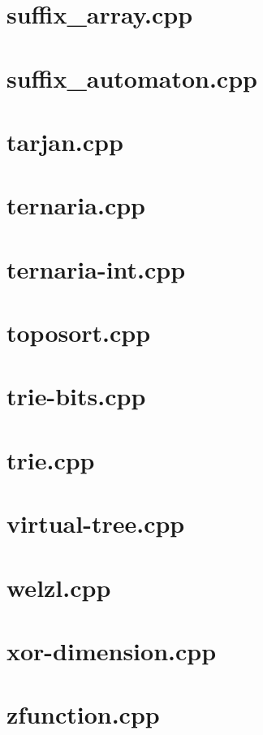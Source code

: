 \documentclass[a4paper,12pt]{article}
\begin{document}
\section{suffix_array.cpp}


\section{suffix_automaton.cpp}


\section{tarjan.cpp}


\section{ternaria.cpp}


\section{ternaria-int.cpp}


\section{toposort.cpp}


\section{trie-bits.cpp}


\section{trie.cpp}


\section{virtual-tree.cpp}


\section{welzl.cpp}


\section{xor-dimension.cpp}


\section{zfunction.cpp}

\end{document}
